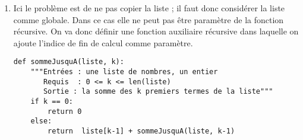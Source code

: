 \begin{Answer}
\begin{enumerate}
\item Ici le problème est de ne pas copier la liste ; il faut donc considérer la liste comme globale. Dans ce cas elle ne peut pas être paramètre de la fonction récursive. On va donc définir une fonction auxiliaire récursive dans laquelle on ajoute l'indice de fin de calcul comme paramètre.
\begin{lstlisting}
def sommeJusquA(liste, k):
    """Entrées : une liste de nombres, un entier
       Requis  : 0 <= k <= len(liste)
       Sortie : la somme des k premiers termes de la liste"""
    if k == 0:
        return 0
    else:
        return  liste[k-1] + sommeJusquA(liste, k-1)


\end{lstlisting}
\end{enumerate}
\end{Answer}
